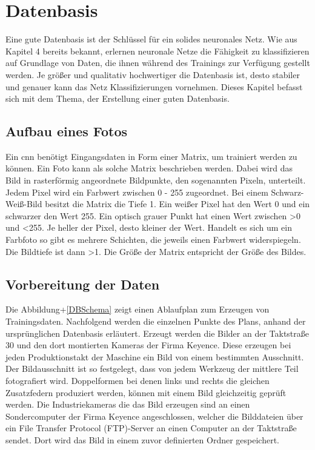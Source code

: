 %
%




\chapter{Datenbasis}

Eine gute Datenbasis ist der Schlüssel für ein solides neuronales Netz. Wie aus Kapitel
4 bereits bekannt, erlernen neuronale Netze die Fähigkeit zu klassifizieren auf Grundlage
von Daten, die ihnen während des Trainings zur Verfügung gestellt werden. Je größer
und qualitativ hochwertiger die Datenbasis ist, desto stabiler und genauer kann das Netz
Klassifizierungen vornehmen. Dieses Kapitel befasst sich mit dem Thema, der Erstellung
einer guten Datenbasis.

\section{Aufbau eines Fotos}

Ein \ac{cnn} benötigt Eingangsdaten in Form einer Matrix, um trainiert werden zu können.
Ein Foto kann als solche Matrix beschrieben werden. Dabei wird das Bild in rasterförmig
angeordnete Bildpunkte, den sogenannten Pixeln, unterteilt. Jedem Pixel wird ein Farbwert 
zwischen 0 - 255 zugeordnet. Bei einem Schwarz-Weiß-Bild besitzt die Matrix die
Tiefe 1. Ein weißer Pixel hat den Wert 0 und ein schwarzer den Wert 255. Ein optisch
grauer Punkt hat einen Wert zwischen >0 und <255. Je heller der Pixel, desto kleiner
der Wert. Handelt es sich um ein Farbfoto so gibt es mehrere Schichten, die jeweils einen
Farbwert widerspiegeln. Die Bildtiefe ist dann >1. Die Größe der Matrix entspricht der
Größe des Bildes. \cite{Python:2020b}

\section{Vorbereitung der Daten}

Die Abbildung+\ref{DBSchema} zeigt einen Ablaufplan zum Erzeugen von Trainingsdaten. Nachfolgend
werden die einzelnen Punkte des Plans, anhand der ursprünglichen Datenbasis erläutert.
Erzeugt werden die Bilder an der Taktstraße 30 und den dort montierten Kameras der Firma 
Keyence. Diese erzeugen bei jeden Produktionstakt der Maschine ein Bild von einem
bestimmten Ausschnitt. Der Bildausschnitt ist so festgelegt, dass von jedem Werkzeug
der mittlere Teil fotografiert wird. Doppelformen bei denen links und rechts die gleichen
Zusatzfedern produziert werden, können mit einem Bild gleichzeitig geprüft werden. Die
Industriekameras die das Bild erzeugen sind an einen Sondercomputer der Firma Keyence
angeschlossen, welcher die Bilddateien über ein File Transfer Protocol (FTP)-Server an
einen Computer an der Taktstraße sendet. Dort wird das Bild in einem zuvor definierten
Ordner gespeichert.

